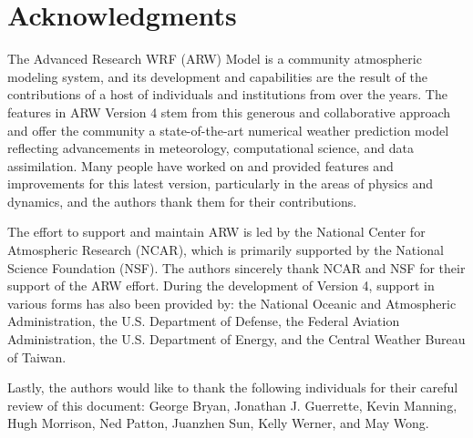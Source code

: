 \chapter*{Acknowledgments}

\hskip 15pt 
The Advanced Research WRF (ARW) Model is a community 
atmospheric modeling system, and its development and capabilities 
are the result of the contributions of a host of individuals and 
institutions from over the years.  The features in ARW Version 4 
stem from this generous and collaborative approach and offer the community 
a state-of-the-art numerical weather prediction model reflecting 
advancements in meteorology, computational science, and
data assimilation.  Many people have worked on and provided 
features and improvements for this latest version, particularly in 
the areas of physics and dynamics, and the authors thank them for 
their contributions.

\vskip 10pt
The effort to support and maintain ARW is led by the National Center for 
Atmospheric Research (NCAR), which is primarily supported by the National Science 
Foundation (NSF).  The authors sincerely thank NCAR and NSF for their support of 
the ARW effort.  During the development of Version 4, support 
in various forms has also been provided by: the National Oceanic 
and Atmospheric Administration, the U.S. Department of Defense, the
Federal Aviation Administration, the U.S. Department of Energy, and
the Central Weather Bureau of Taiwan.

\vskip 10pt
Lastly, the authors would like to thank the following individuals for their 
careful review of this document: George Bryan, Jonathan J. Guerrette, 
Kevin Manning, Hugh Morrison, Ned Patton, Juanzhen Sun, Kelly Werner, and May Wong.



